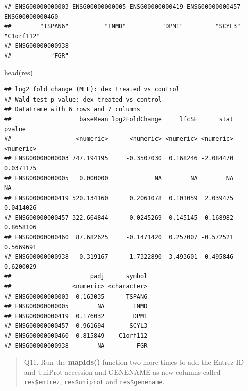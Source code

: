 \documentclass[
]{article}
\newenvironment{Shaded}{\begin{snugshade}}{\end{snugshade}}
\newcommand{\AttributeTok}[1]{\textcolor[rgb]{0.77,0.63,0.00}{#1}}
\newcommand{\FunctionTok}[1]{\textcolor[rgb]{0.00,0.00,0.00}{#1}}
\newcommand{\NormalTok}[1]{#1}
\newcommand{\OtherTok}[1]{\textcolor[rgb]{0.56,0.35,0.01}{#1}}
\newcommand{\SpecialCharTok}[1]{\textcolor[rgb]{0.00,0.00,0.00}{#1}}
\newcommand{\StringTok}[1]{\textcolor[rgb]{0.31,0.60,0.02}{#1}}
\begin{document}
\begin{verbatim}
## ENSG00000000003 ENSG00000000005 ENSG00000000419 ENSG00000000457 ENSG00000000460 
##        "TSPAN6"          "TNMD"          "DPM1"         "SCYL3"      "C1orf112" 
## ENSG00000000938 
##           "FGR"
\end{verbatim}

\begin{Shaded}
\begin{Highlighting}[]
\FunctionTok{head}\NormalTok{(res)}
\end{Highlighting}
\end{Shaded}

\begin{verbatim}
## log2 fold change (MLE): dex treated vs control 
## Wald test p-value: dex treated vs control 
## DataFrame with 6 rows and 7 columns
##                   baseMean log2FoldChange     lfcSE      stat    pvalue
##                  <numeric>      <numeric> <numeric> <numeric> <numeric>
## ENSG00000000003 747.194195     -0.3507030  0.168246 -2.084470 0.0371175
## ENSG00000000005   0.000000             NA        NA        NA        NA
## ENSG00000000419 520.134160      0.2061078  0.101059  2.039475 0.0414026
## ENSG00000000457 322.664844      0.0245269  0.145145  0.168982 0.8658106
## ENSG00000000460  87.682625     -0.1471420  0.257007 -0.572521 0.5669691
## ENSG00000000938   0.319167     -1.7322890  3.493601 -0.495846 0.6200029
##                      padj      symbol
##                 <numeric> <character>
## ENSG00000000003  0.163035      TSPAN6
## ENSG00000000005        NA        TNMD
## ENSG00000000419  0.176032        DPM1
## ENSG00000000457  0.961694       SCYL3
## ENSG00000000460  0.815849    C1orf112
## ENSG00000000938        NA         FGR
\end{verbatim}

\begin{quote}
Q11. Run the \textbf{mapIds()} function two more times to add the Entrez
ID and UniProt accession and GENENAME as new columns called
\texttt{res\$entrez}, \texttt{res\$uniprot} and \texttt{res\$genename}.
\end{quote}

\begin{Shaded}
\end{Shaded}
\end{document}
